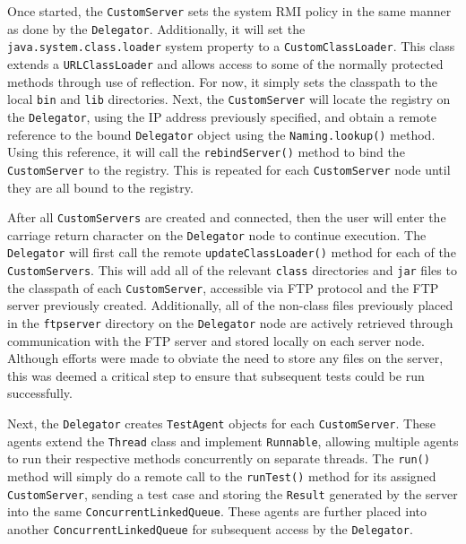 \documentclass{article}
\begin{document}
{Once started, the \texttt{CustomServer} sets the system RMI policy in the same manner as done by the \texttt{Delegator}.  Additionally, it will set the \texttt{java.system.class.loader} system property to a \texttt{CustomClassLoader}.  This class extends a \texttt{URLClassLoader} and allows access to some of the normally protected methods through use of reflection.  For now, it simply sets the classpath to the local \texttt{bin} and \texttt{lib} directories.  Next, the \texttt{CustomServer} will locate the registry on the \texttt{Delegator}, using the IP address previously specified, and obtain a remote reference to the bound \texttt{Delegator} object using the \texttt{Naming.lookup()} method.  Using this reference, it will call the \texttt{rebindServer()} method to bind the \texttt{CustomServer} to the registry.  This is repeated for each \texttt{CustomServer} node until they are all bound to the registry.

After all \texttt{CustomServers} are created and connected, then the user will enter the carriage return character on the \texttt{Delegator} node to continue execution.  The \texttt{Delegator} will first call the remote \texttt{updateClassLoader()} method for each of the \texttt{CustomServers}.  This will add all of the relevant \texttt{class} directories and \texttt{jar} files to the classpath of each \texttt{CustomServer}, accessible via FTP protocol and the FTP server previously created.  Additionally, all of the non-class files previously placed in the \texttt{ftpserver} directory on the \texttt{Delegator} node are actively retrieved through communication with the FTP server and stored locally on each server node.  Although efforts were made to obviate the need to store any files on the server, this was deemed a critical step to ensure that subsequent tests could be run successfully.

Next, the \texttt{Delegator} creates \texttt{TestAgent} objects for each \texttt{CustomServer}.  These agents extend the \texttt{Thread} class and implement \texttt{Runnable}, allowing multiple agents to run their respective methods concurrently on separate threads.  The \texttt{run()} method will simply do a remote call to the \texttt{runTest()} method for its assigned \texttt{CustomServer}, sending a test case and storing the \texttt{Result} generated by the server into the same \texttt{ConcurrentLinkedQueue}.  These agents are further placed into another \texttt{ConcurrentLinkedQueue} for subsequent access by the \texttt{Delegator}.

}
\end{document}

